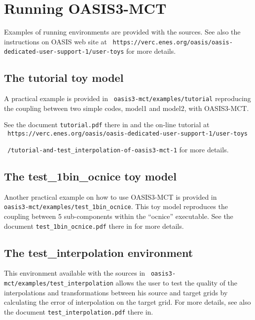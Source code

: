 \section{Running OASIS3-MCT}
\label{subsec_running}

Examples of running environments are provided with the sources. See also the instructions on OASIS web site at
{\tt
  https://verc.enes.org/oasis/oasis-dedicated-user-support-1/user-toys}
for more details.

\subsection{The tutorial toy model}
\label{subsec_tutorial}

A practical example  is provided in {\tt
  oasis3-mct/examples/tutorial} reproducing the coupling between two
simple codes, model1 and model2, with OASIS3-MCT. 

See
the document {\tt tutorial.pdf} there in and the on-line
tutorial at \\
{\tt
  https://verc.enes.org/oasis/oasis-dedicated-user-support-1/user-toys}

{\tt
 /tutorial-and-test\_interpolation-of-oasis3-mct-1}
for more details.

\subsection{The test\_1bin\_ocnice toy model}
\label{subsec_1bin_ocnice}

Another practical example on how to use OASIS3-MCT is provided in \\ {\tt oasis3-mct/examples/test\_1bin\_ocnice}. 
This toy model reproduces the coupling between 5 sub-components within
the “ocnice” executable. See
the document {\tt test\_1bin\_ocnice.pdf} there in for more details.

\subsection{The test\_interpolation environment}
\label{subsec_testinterpolation}

This environment available with the sources in {\tt
  oasis3-mct/examples/test\_interpolation} allows the user to test the
quality of the interpolations and transformations between his source
and target grids by calculating the error of interpolation on the
target grid. For more details, see also the document {\tt test\_interpolation.pdf} there in.

